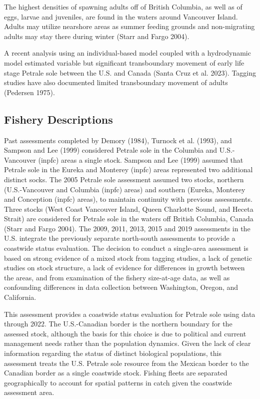 \documentclass[
]{scrartcl}
\begin{document}
The highest densities of spawning adults off of British Columbia, as
well as of eggs, larvae and juveniles, are found in the waters around
Vancouver Island. Adults may utilize nearshore areas as summer feeding
grounds and non-migrating adults may stay there during winter (Starr and
Fargo 2004).

A recent analysis using an individual-based model coupled with a
hydrodynamic model estimated variable but significant transboundary
movement of early life stage Petrale sole between the U.S. and Canada
(Santa Cruz et al. 2023). Tagging studies have also documented limited
transboundary movement of adults (Pedersen 1975).

\subsection{Fishery Descriptions}\label{fishery-descriptions}

Past assessments completed by Demory (1984), Turnock et al. (1993), and
Sampson and Lee (1999) considered Petrale sole in the Columbia and
U.S.-Vancouver (inpfc) areas a single stock. Sampson and Lee (1999)
assumed that Petrale sole in the Eureka and Monterey (inpfc) areas
represented two additional distinct socks. The 2005 Petrale sole
assessment assumed two stocks, northern (U.S.-Vancouver and Columbia
(inpfc) areas) and southern (Eureka, Monterey and Conception (inpfc)
areas), to maintain continuity with previous assessments. Three stocks
(West Coast Vancouver Island, Queen Charlotte Sound, and Heceta Strait)
are considered for Petrale sole in the waters off British Columbia,
Canada (Starr and Fargo 2004). The 2009, 2011, 2013, 2015 and 2019
assessments in the U.S. integrate the previously separate north-south
assessments to provide a coastwide status evaluation. The decision to
conduct a single-area assessment is based on strong evidence of a mixed
stock from tagging studies, a lack of genetic studies on stock
structure, a lack of evidence for differences in growth between the
areas, and from examination of the fishery size-at-age data, as well as
confounding differences in data collection between Washington, Oregon,
and California.

This assessment provides a coastwide status evaluation for Petrale sole
using data through 2022. The U.S.-Canadian border is the northern
boundary for the assessed stock, although the basis for this choice is
due to political and current management needs rather than the population
dynamics. Given the lack of clear information regarding the status of
distinct biological populations, this assessment treats the U.S. Petrale
sole resource from the Mexican border to the Canadian border as a single
coastwide stock. Fishing fleets are separated geographically to account
for spatial patterns in catch given the coastwide assessment area.
\end{document}
